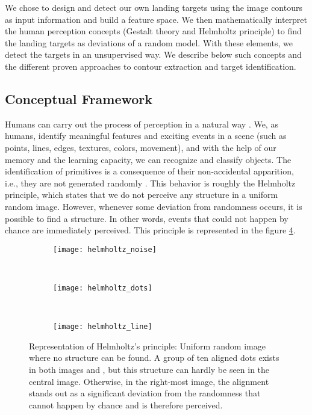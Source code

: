 We chose to design and detect our own landing targets using the image contours as input information and build a feature space. We then mathematically interpret the human perception concepts (Gestalt theory and Helmholtz principle) to find the landing targets as deviations of a random model.  With these elements, we detect the targets in an unsupervised way. We describe below such concepts and the different proven approaches to contour extraction and target identification.


\subsection{Conceptual Framework}
Humans can carry out the process of perception in a natural way \citep{Petitot:Neurogeometrie:2008}. We, as humans, identify meaningful features and exciting events in a scene (such as points, lines, edges, textures, colors, movement), and with the help of our memory and the learning capacity, we can recognize and classify objects. The identification of primitives is a consequence of their non-accidental apparition, i.e., they are not generated randomly \citep{Attneave:PR:1954}. This behavior is roughly the Helmholtz principle, which states that we do not perceive any structure in a uniform random image. However, whenever some deviation from randomness occurs, it is possible to find a structure. In other words, events that could not happen by chance are immediately perceived. This principle is represented in the figure \ref{fig:helmholtz_principle}.

\begin{figure}[!ht]
    \centering
    \begin{subfigure}[b]{0.25\textwidth}
        \texttt{[image: helmholtz\_noise]}
        \caption{}
        \label{fig:helmholtz_noise}
    \end{subfigure}
        ~ %
    \begin{subfigure}[b]{0.25\textwidth}
        \texttt{[image: helmholtz\_dots]}
        \caption{}
        \label{fig:helmholtz_dots}
    \end{subfigure}
        ~ %
    \begin{subfigure}[b]{0.25\textwidth}
        \texttt{[image: helmholtz\_line]}
        \caption{}
        \label{fig:helmholtz_line}
    \end{subfigure}
        
    \caption{Representation of Helmholtz's principle:  Uniform random image where no structure can be found. A group of ten aligned dots exists in both images and , but this structure can hardly be seen in the central image. Otherwise, in the right-most image, the alignment stands out as a significant deviation from the randomness that cannot happen by chance and is therefore perceived.}\label{fig:helmholtz_principle}
\end{figure}

